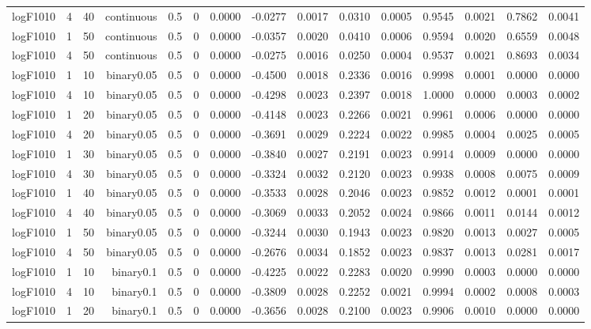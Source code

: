 \begin{longtable}{rrrrrrrrrrrrrrr}
  logF1010 & 4 & 40 & continuous & 0.5 & 0 & 0.0000 & -0.0277 & 0.0017 & 0.0310 & 0.0005 & 0.9545 & 0.0021 & 0.7862 & 0.0041 \\ 
  logF1010 & 1 & 50 & continuous & 0.5 & 0 & 0.0000 & -0.0357 & 0.0020 & 0.0410 & 0.0006 & 0.9594 & 0.0020 & 0.6559 & 0.0048 \\ 
  logF1010 & 4 & 50 & continuous & 0.5 & 0 & 0.0000 & -0.0275 & 0.0016 & 0.0250 & 0.0004 & 0.9537 & 0.0021 & 0.8693 & 0.0034 \\ 
  logF1010 & 1 & 10 & binary0.05 & 0.5 & 0 & 0.0000 & -0.4500 & 0.0018 & 0.2336 & 0.0016 & 0.9998 & 0.0001 & 0.0000 & 0.0000 \\ 
  logF1010 & 4 & 10 & binary0.05 & 0.5 & 0 & 0.0000 & -0.4298 & 0.0023 & 0.2397 & 0.0018 & 1.0000 & 0.0000 & 0.0003 & 0.0002 \\ 
  logF1010 & 1 & 20 & binary0.05 & 0.5 & 0 & 0.0000 & -0.4148 & 0.0023 & 0.2266 & 0.0021 & 0.9961 & 0.0006 & 0.0000 & 0.0000 \\ 
  logF1010 & 4 & 20 & binary0.05 & 0.5 & 0 & 0.0000 & -0.3691 & 0.0029 & 0.2224 & 0.0022 & 0.9985 & 0.0004 & 0.0025 & 0.0005 \\ 
  logF1010 & 1 & 30 & binary0.05 & 0.5 & 0 & 0.0000 & -0.3840 & 0.0027 & 0.2191 & 0.0023 & 0.9914 & 0.0009 & 0.0000 & 0.0000 \\ 
  logF1010 & 4 & 30 & binary0.05 & 0.5 & 0 & 0.0000 & -0.3324 & 0.0032 & 0.2120 & 0.0023 & 0.9938 & 0.0008 & 0.0075 & 0.0009 \\ 
  logF1010 & 1 & 40 & binary0.05 & 0.5 & 0 & 0.0000 & -0.3533 & 0.0028 & 0.2046 & 0.0023 & 0.9852 & 0.0012 & 0.0001 & 0.0001 \\ 
  logF1010 & 4 & 40 & binary0.05 & 0.5 & 0 & 0.0000 & -0.3069 & 0.0033 & 0.2052 & 0.0024 & 0.9866 & 0.0011 & 0.0144 & 0.0012 \\ 
  logF1010 & 1 & 50 & binary0.05 & 0.5 & 0 & 0.0000 & -0.3244 & 0.0030 & 0.1943 & 0.0023 & 0.9820 & 0.0013 & 0.0027 & 0.0005 \\ 
  logF1010 & 4 & 50 & binary0.05 & 0.5 & 0 & 0.0000 & -0.2676 & 0.0034 & 0.1852 & 0.0023 & 0.9837 & 0.0013 & 0.0281 & 0.0017 \\ 
  logF1010 & 1 & 10 & binary0.1 & 0.5 & 0 & 0.0000 & -0.4225 & 0.0022 & 0.2283 & 0.0020 & 0.9990 & 0.0003 & 0.0000 & 0.0000 \\ 
  logF1010 & 4 & 10 & binary0.1 & 0.5 & 0 & 0.0000 & -0.3809 & 0.0028 & 0.2252 & 0.0021 & 0.9994 & 0.0002 & 0.0008 & 0.0003 \\ 
  logF1010 & 1 & 20 & binary0.1 & 0.5 & 0 & 0.0000 & -0.3656 & 0.0028 & 0.2100 & 0.0023 & 0.9906 & 0.0010 & 0.0000 & 0.0000 \\ 

\end{longtable}
